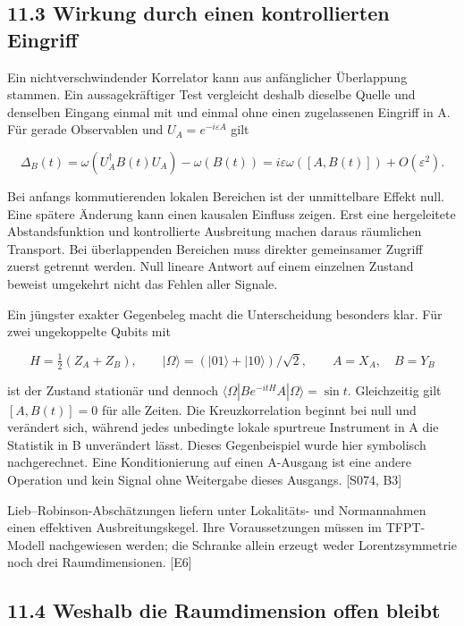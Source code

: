 \subsection{11.3 Wirkung durch einen kontrollierten
Eingriff}\label{wirkung-durch-einen-kontrollierten-eingriff}

Ein nichtverschwindender Korrelator kann aus anfänglicher Überlappung
stammen. Ein aussagekräftiger Test vergleicht deshalb dieselbe Quelle
und denselben Eingang einmal mit und einmal ohne einen zugelassenen
Eingriff in A. Für gerade Observablen und \(U_A=e^{-i\varepsilon A}\)
gilt

\[\Delta_B(t)=\omega(U_A^\dagger B(t)U_A)-\omega(B(t))
=i\varepsilon\omega([A,B(t)])+O(\varepsilon^2).\]

Bei anfangs kommutierenden lokalen Bereichen ist der unmittelbare Effekt
null. Eine spätere Änderung kann einen kausalen Einfluss zeigen. Erst
eine hergeleitete Abstandsfunktion und kontrollierte Ausbreitung machen
daraus räumlichen Transport. Bei überlappenden Bereichen muss direkter
gemeinsamer Zugriff zuerst getrennt werden. Null lineare Antwort auf
einem einzelnen Zustand beweist umgekehrt nicht das Fehlen aller
Signale.

Ein jüngster exakter Gegenbeleg macht die Unterscheidung besonders klar.
Für zwei ungekoppelte Qubits mit

\[H=\tfrac12(Z_A+Z_B),\qquad
|\Omega\rangle=(|01\rangle+|10\rangle)/\sqrt2,\qquad A=X_A,\quad B=Y_B\]

ist der Zustand stationär und dennoch
\(\langle\Omega|B e^{-itH}A|\Omega\rangle=\sin t\). Gleichzeitig gilt
\([A,B(t)]=0\) für alle Zeiten. Die Kreuzkorrelation beginnt bei null
und verändert sich, während jedes unbedingte lokale spurtreue Instrument
in A die Statistik in B unverändert lässt. Dieses Gegenbeispiel wurde
hier symbolisch nachgerechnet. Eine Konditionierung auf einen A-Ausgang
ist eine andere Operation und kein Signal ohne Weitergabe dieses
Ausgangs. {[}S074, B3{]}

Lieb--Robinson-Abschätzungen liefern unter Lokalitäts- und Normannahmen
einen effektiven Ausbreitungskegel. Ihre Voraussetzungen müssen im
TFPT-Modell nachgewiesen werden; die Schranke allein erzeugt weder
Lorentzsymmetrie noch drei Raumdimensionen. {[}E6{]}

\subsection{11.4 Weshalb die Raumdimension offen
bleibt}\label{weshalb-die-raumdimension-offen-bleibt}

